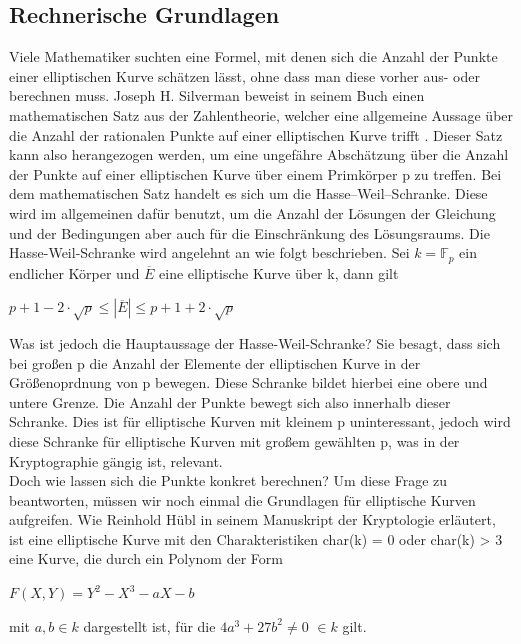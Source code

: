 \subsection{Rechnerische Grundlagen}
Viele Mathematiker suchten eine Formel, mit denen sich die Anzahl der Punkte einer elliptischen Kurve schätzen lässt, ohne dass man diese vorher aus- oder berechnen muss. Joseph H. Silverman beweist in seinem Buch einen mathematischen Satz aus der Zahlentheorie, welcher eine allgemeine Aussage über die Anzahl der rationalen Punkte auf einer elliptischen Kurve trifft \cite[S. 138]{JosephH.Silverman.2009}. Dieser Satz kann also herangezogen werden, um eine ungefähre Abschätzung über die Anzahl der Punkte auf einer elliptischen Kurve über einem Primkörper p zu treffen. Bei dem mathematischen Satz handelt es sich um die Hasse–Weil–Schranke. Diese wird im allgemeinen dafür benutzt, um die Anzahl der Lösungen der Gleichung und der Bedingungen aber auch für die Einschränkung des Lösungsraums. Die Hasse-Weil-Schranke wird angelehnt an \cite[S. 181]{Dr.ReinholdHubl.2022} wie folgt beschrieben. Sei $k = \mathbb{F}_p$ ein endlicher Körper und $\overline{E}$ eine elliptische Kurve über k, dann gilt
\begin{center}
$p + 1 - 2 \cdot \sqrt{p} \leq | \overline{E} | \leq p + 1 + 2 \cdot \sqrt{p}$
\end{center} 

Was ist jedoch die Hauptaussage der Hasse-Weil-Schranke? Sie besagt, dass sich bei großen p die Anzahl der Elemente der elliptischen Kurve in der Größenoprdnung von p bewegen. Diese Schranke bildet hierbei eine obere und untere Grenze. Die Anzahl der Punkte bewegt sich also innerhalb dieser Schranke. Dies ist für elliptische Kurven mit kleinem p uninteressant, jedoch wird diese Schranke für elliptische Kurven mit großem gewählten p, was in der Kryptographie gängig ist, relevant.\\


Doch wie lassen sich die Punkte konkret berechnen? Um diese Frage zu beantworten, müssen wir noch einmal die Grundlagen für elliptische Kurven aufgreifen. Wie Reinhold Hübl in seinem Manuskript der Kryptologie \cite[S. 157]{Dr.ReinholdHubl.2022} erläutert, ist eine elliptische Kurve mit den Charakteristiken char(k) = 0 oder char(k) > 3 eine Kurve, die durch ein Polynom der Form
\begin{center}
$F(X, Y) = Y^{2} - X^{3} - aX - b$
\end{center} 

mit $a, b \in k$ dargestellt ist, für die $4a^3 + 27b^2 \neq 0$  $\in k$ gilt.\\

